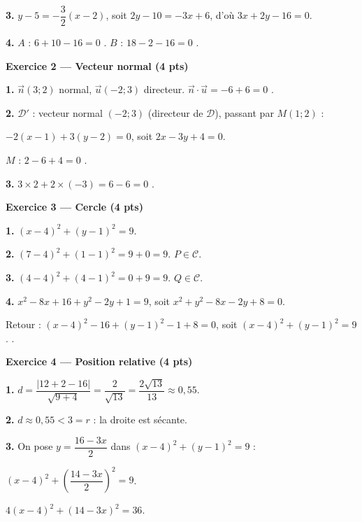 \textbf{3.} $y - 5 = -\dfrac{3}{2}(x - 2)$, soit $2y - 10 = -3x + 6$, d'où $3x + 2y - 16 = 0$.

\textbf{4.} $A$ : $6 + 10 - 16 = 0$ \checkmark. $B$ : $18 - 2 - 16 = 0$ \checkmark.

\bigskip

\textbf{Exercice 2 — Vecteur normal (4 pts)}


\textbf{1.} $\vec{n}(3 ; 2)$ normal, $\vec{u}(-2 ; 3)$ directeur. $\vec{n} \cdot \vec{u} = -6 + 6 = 0$ \checkmark.

\textbf{2.} $\mathcal{D}'$ : vecteur normal $(-2 ; 3)$ (directeur de $\mathcal{D}$), passant par $M(1 ; 2)$ :

$-2(x-1) + 3(y-2) = 0$, soit $2x - 3y + 4 = 0$.

$M$ : $2 - 6 + 4 = 0$ \checkmark.

\textbf{3.} $3 \times 2 + 2 \times (-3) = 6 - 6 = 0$ \checkmark.

\bigskip

\textbf{Exercice 3 — Cercle (4 pts)}


\textbf{1.} $(x - 4)^2 + (y - 1)^2 = 9$.

\textbf{2.} $(7-4)^2 + (1-1)^2 = 9 + 0 = 9$. $P \in \mathcal{C}$.

\textbf{3.} $(4-4)^2 + (4-1)^2 = 0 + 9 = 9$. $Q \in \mathcal{C}$.

\textbf{4.} $x^2 - 8x + 16 + y^2 - 2y + 1 = 9$, soit $x^2 + y^2 - 8x - 2y + 8 = 0$.

Retour : $(x-4)^2 - 16 + (y-1)^2 - 1 + 8 = 0$, soit $(x-4)^2 + (y-1)^2 = 9$. \checkmark.

\bigskip

\textbf{Exercice 4 — Position relative (4 pts)}


\textbf{1.} $d = \dfrac{|12 + 2 - 16|}{\sqrt{9+4}} = \dfrac{2}{\sqrt{13}} = \dfrac{2\sqrt{13}}{13} \approx 0{,}55$.

\textbf{2.} $d \approx 0{,}55 < 3 = r$ : la droite est sécante.

\textbf{3.} On pose $y = \dfrac{16 - 3x}{2}$ dans $(x-4)^2 + (y-1)^2 = 9$ :

$(x-4)^2 + \left(\dfrac{14-3x}{2}\right)^2 = 9$.

$4(x-4)^2 + (14-3x)^2 = 36$.

